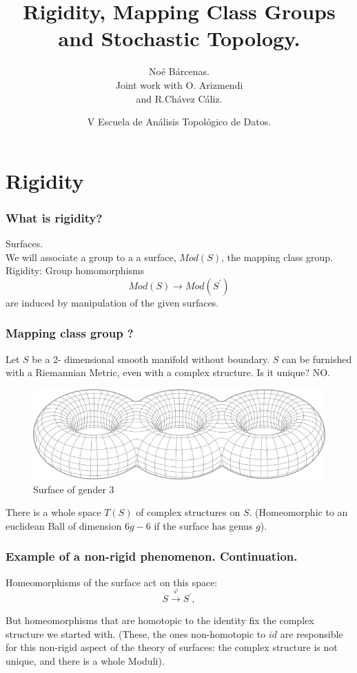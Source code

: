\documentclass[handout]{beamer}
\title{Rigidity, Mapping  Class Groups  and Stochastic Topology. }
\author{No\'e B\'arcenas.\\ Joint work with O. Arizmendi \\  and R.Ch\'avez C\'aliz.}
\institute{Centro de  Ciencias Matem\'aticas. \\ UNAM. }
\date{V Escuela  de  An\'alisis Topol\'ogico  de  Datos.}
\theoremstyle{plain}
\begin{document}
\begin{frame}
\titlepage
\end{frame}



\section{Rigidity}

\begin{frame}
\frametitle{What  is  rigidity?}

Surfaces. \\

We  will  associate a  group  to  a  a  surface, $Mod(S)$,  the  mapping  class  group. \pause
Rigidity: Group  homomorphisms 
$$ Mod(S) \to Mod  (S^{'})$$
are  induced  by  manipulation  of  the  given surfaces. 
\end{frame}



\begin{frame}\frametitle{Mapping  class group ?}

Let  $S$  be  a 2- dimensional  smooth  manifold without  boundary. \pause
$S$  can  be  furnished  with  a Riemannian  Metric, even with  a  complex structure. \pause Is  it  unique? \pause
NO. \pause 

\begin{figure}[h!]
	\centering
	\includegraphics[scale=0.35]{CHARLA_STOCHASTIC_TOPOLOGY_MCG_CIMATNOVEMBER_2018/multitorus.png}
	\caption{Surface of gender 3}
\end{figure}

There  is  a  whole  space $T(S)$ of  complex  structures  on  $S$. \pause (Homeomorphic  to  an  euclidean Ball  of  dimension $6g-6$  if  the  surface  has  genus  $g$). \pause 

\end{frame}
\begin{frame}\frametitle{Example  of  a  non-rigid phenomenon. Continuation.}

Homeomorphisms  of  the  surface  act  on  this space: 
$$ S\overset{\varphi }{\to } S^{'}, $$ \pause 


But homeomorphisms  that  are homotopic   to the  identity fix  the  complex structure we  started with. \pause 
(These, the   ones non-homotopic  to $id$  are  responsible  for  this  non-rigid  aspect of  the  theory  of  surfaces: the  complex  structure  is  not  unique, and  there  is  a  whole  Moduli). 

\end{frame}
\end{document}
